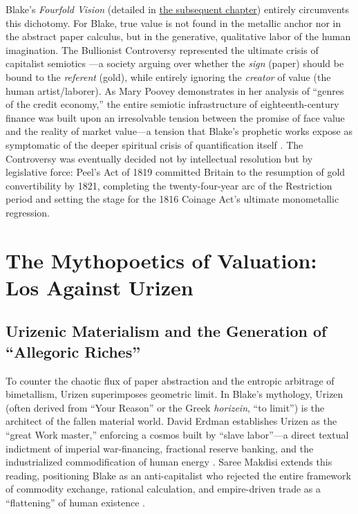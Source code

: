 \documentclass[
]{article}
\begin{document}
Blake's \emph{Fourfold Vision} (detailed in
\href{03a_urizenic_materialism.md\#urizenic-materialism-and-the-generation-of-allegoric-riches}{the
subsequent chapter}) entirely circumvents this dichotomy. For Blake,
true value is not found in the metallic anchor nor in the abstract paper
calculus, but in the generative, qualitative labor of the human
imagination. The Bullionist Controversy represented the ultimate crisis
of capitalist semiotics \citep{fetter1965development}---a society
arguing over whether the \emph{sign} (paper) should be bound to the
\emph{referent} (gold), while entirely ignoring the \emph{creator} of
value (the human artist/laborer). As Mary Poovey demonstrates in her
analysis of ``genres of the credit economy,'' the entire semiotic
infrastructure of eighteenth-century finance was built upon an
irresolvable tension between the promise of face value and the reality
of market value---a tension that Blake's prophetic works expose as
symptomatic of the deeper spiritual crisis of quantification itself
\citep{poovey2008genres}. The Controversy was eventually decided not by
intellectual resolution but by legislative force: Peel's Act of 1819
committed Britain to the resumption of gold convertibility by 1821,
completing the twenty-four-year arc of the Restriction period and
setting the stage for the 1816 Coinage Act's ultimate monometallic
regression.

\newpage

\section{The Mythopoetics of Valuation: Los Against
Urizen}\label{the-mythopoetics-of-valuation-los-against-urizen}

\subsection{Urizenic Materialism and the Generation of ``Allegoric
Riches''}\label{urizenic-materialism-and-the-generation-of-allegoric-riches}

To counter the chaotic flux of paper abstraction and the entropic
arbitrage of bimetallism, Urizen superimposes geometric limit. In
Blake's mythology, Urizen (often derived from ``Your Reason'' or the
Greek \emph{horizein}, ``to limit'') is the architect of the fallen
material world. David Erdman establishes Urizen as the ``great Work
master,'' enforcing a cosmos built by ``slave labor''---a direct textual
indictment of imperial war-financing, fractional reserve banking, and
the industrialized commodification of human energy
\citep{erdman1954prophet}. Saree Makdisi extends this reading,
positioning Blake as an anti-capitalist who rejected the entire
framework of commodity exchange, rational calculation, and empire-driven
trade as a ``flattening'' of human existence \citep{makdisi2003william}.
\end{document}
